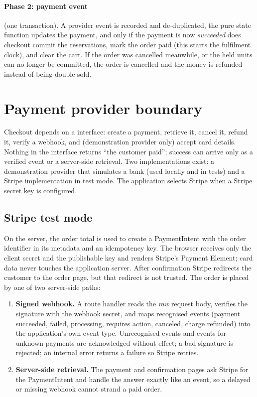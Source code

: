 \paragraph{Phase 2: payment event} (one transaction). A provider event is recorded and de-duplicated, the pure state function updates the payment, and only if the payment is now \emph{succeeded} does checkout commit the reservations, mark the order paid (this starts the fulfilment clock), and clear the cart. If the order was cancelled meanwhile, or the held units can no longer be committed, the order is cancelled and the money is refunded instead of being double-sold.

\section{Payment provider boundary}

Checkout depends on a  interface: create a payment, retrieve it, cancel it, refund it, verify a webhook, and (demonstration provider only) accept card details. Nothing in the interface returns ``the customer paid''; success can arrive only as a verified event or a server-side retrieval. Two implementations exist: a demonstration provider that simulates a bank (used locally and in tests) and a Stripe implementation in test mode. The application selects Stripe when a Stripe secret key is configured. \tagimpl{}

\subsection{Stripe test mode}

On the server, the order total is used to create a PaymentIntent with the order identifier in its metadata and an idempotency key. The browser receives only the client secret and the publishable key and renders Stripe's Payment Element; card data never touches the application server. After confirmation Stripe redirects the customer to the order page, but that redirect is not trusted. The order is placed by one of two server-side paths:

\begin{enumerate}
\item \textbf{Signed webhook.} A route handler reads the \emph{raw} request body, verifies the signature with the webhook secret, and maps recognised events (payment succeeded, failed, processing, requires action, canceled, charge refunded) into the application's own event type. Unrecognised events and events for unknown payments are acknowledged without effect; a bad signature is rejected; an internal error returns a failure so Stripe retries.
\item \textbf{Server-side retrieval.} The payment and confirmation pages ask Stripe for the PaymentIntent and handle the answer exactly like an event, so a delayed or missing webhook cannot strand a paid order.
\end{enumerate}

